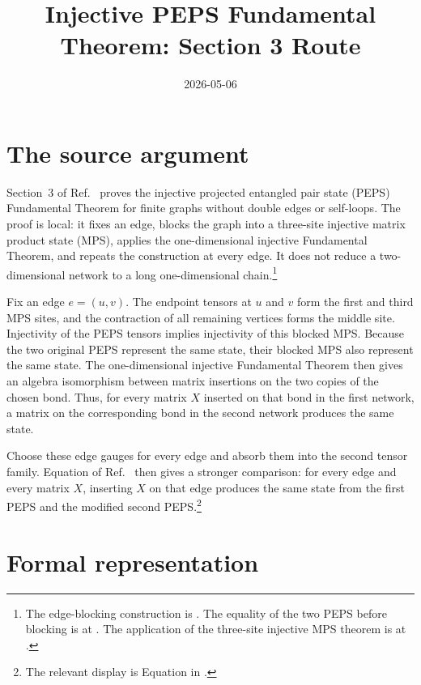 \documentclass{article}
\title{Injective PEPS Fundamental Theorem: Section 3 Route}
\author{}
\date{2026-05-06}
\begin{document}
\maketitle
{}

\section{The source argument}

Section~3 of Ref.~\cite{Molnar2018NormalPEPS} proves the injective projected
entangled pair state (PEPS) Fundamental Theorem for finite graphs without
double edges or self-loops. The proof is local: it fixes an edge, blocks the
graph into a three-site injective matrix product state (MPS), applies the
one-dimensional injective Fundamental Theorem, and repeats the construction at
every edge. It does not reduce a two-dimensional network to a long
one-dimensional chain.\footnote{The edge-blocking construction is
. The equality of the two
PEPS before blocking is at
. The application of the
three-site injective MPS theorem is at
.}

Fix an edge $e=(u,v)$. The endpoint tensors at $u$ and $v$ form the first and
third MPS sites, and the contraction of all remaining vertices forms the middle
site. Injectivity of the PEPS tensors implies injectivity of this blocked MPS.
Because the two original PEPS represent the same state, their blocked MPS also
represent the same state. The one-dimensional injective Fundamental Theorem
then gives an algebra isomorphism between matrix insertions on the two copies of
the chosen bond. Thus, for every matrix $X$ inserted on that bond in the first
network, a matrix on the corresponding bond in the second network produces the
same state.

Choose these edge gauges for every edge and absorb them into the second tensor
family. Equation  of
Ref.~\cite{Molnar2018NormalPEPS} then gives a stronger comparison: for every
edge and every matrix $X$, inserting $X$ on that edge produces the same state
from the first PEPS and the modified second PEPS.\footnote{The relevant display
is Equation  in
.}

\section{Formal representation}
\end{document}
